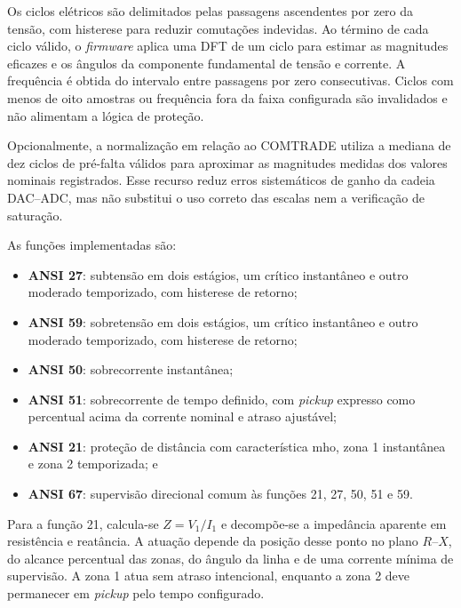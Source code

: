 Os ciclos elétricos são delimitados pelas passagens ascendentes por zero da tensão, com histerese para reduzir comutações indevidas. Ao término de cada ciclo válido, o \textit{firmware} aplica uma DFT de um ciclo para estimar as magnitudes eficazes e os ângulos da componente fundamental de tensão e corrente. A frequência é obtida do intervalo entre passagens por zero consecutivas. Ciclos com menos de oito amostras ou frequência fora da faixa configurada são invalidados e não alimentam a lógica de proteção.

Opcionalmente, a normalização em relação ao COMTRADE utiliza a mediana de dez ciclos de pré-falta válidos para aproximar as magnitudes medidas dos valores nominais registrados. Esse recurso reduz erros sistemáticos de ganho da cadeia DAC--ADC, mas não substitui o uso correto das escalas nem a verificação de saturação.

As funções implementadas são:

\begin{itemize}
  \item \textbf{ANSI 27}: subtensão em dois estágios, um crítico instantâneo e outro moderado temporizado, com histerese de retorno;
  \item \textbf{ANSI 59}: sobretensão em dois estágios, um crítico instantâneo e outro moderado temporizado, com histerese de retorno;
  \item \textbf{ANSI 50}: sobrecorrente instantânea;
  \item \textbf{ANSI 51}: sobrecorrente de tempo definido, com \textit{pickup} expresso como percentual acima da corrente nominal e atraso ajustável;
  \item \textbf{ANSI 21}: proteção de distância com característica mho, zona 1 instantânea e zona 2 temporizada; e
  \item \textbf{ANSI 67}: supervisão direcional comum às funções 21, 27, 50, 51 e 59.
\end{itemize}

Para a função 21, calcula-se $Z=V_1/I_1$ e decompõe-se a impedância aparente em resistência e reatância. A atuação depende da posição desse ponto no plano $R$--$X$, do alcance percentual das zonas, do ângulo da linha e de uma corrente mínima de supervisão. A zona 1 atua sem atraso intencional, enquanto a zona 2 deve permanecer em \textit{pickup} pelo tempo configurado.

